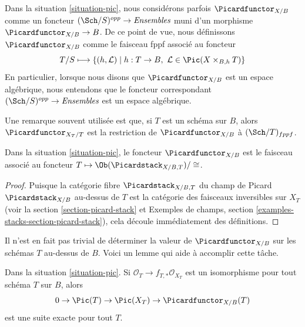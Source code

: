 \noindent
Dans la situation \ref{situation-pic}, nous considérons parfois
$\Picardfunctor_{X/B}$ comme un foncteur $(\Sch/S)^{opp} \to \textit{Ensembles}$
muni d'un morphisme $\Picardfunctor_{X/B} \to B$. De ce point de vue,
nous définissons $\Picardfunctor_{X/B}$ comme le faisceau fppf associé au
foncteur
$$
T/S \longmapsto \{(h, \mathcal{L}) \mid
h : T \to B,\ \mathcal{L} \in \Pic(X \times_{B, h} T)\}
$$
En particulier, lorsque nous disons que $\Picardfunctor_{X/B}$ est un espace
algébrique, nous entendons que le foncteur correspondant
$(\Sch/S)^{opp} \to \textit{Ensembles}$ est un espace algébrique.

\medskip\noindent
Une remarque souvent utilisée est que, si $T$ est un schéma sur $B$, alors
$\Picardfunctor_{X_T/T}$ est la restriction de $\Picardfunctor_{X/B}$ à
$(\Sch/T)_{fppf}$.

\begin{lemma}
\label{lemma-pic-over-pic}
Dans la situation \ref{situation-pic},
le foncteur $\Picardfunctor_{X/B}$ est le faisceau associé au
foncteur $T \mapsto \Ob(\Picardstack_{X/B, T})/\cong$.
\end{lemma}

\begin{proof}
Puisque la catégorie fibre $\Picardstack_{X/B, T}$ du champ de Picard
$\Picardstack_{X/B}$ au-dessus de $T$ est la catégorie des faisceaux inversibles
sur $X_T$ (voir la section \ref{section-picard-stack} et
Exemples de champs, section \ref{examples-stacks-section-picard-stack}),
cela découle immédiatement des définitions.
\end{proof}

\noindent
Il n'est en fait pas trivial de déterminer la valeur de $\Picardfunctor_{X/B}$
sur les schémas $T$ au-dessus de $B$. Voici un lemme qui aide à accomplir cette
tâche.

\begin{lemma}
\label{lemma-flat-geometrically-connected-fibres}
Dans la situation \ref{situation-pic}.
Si $\mathcal{O}_T \to f_{T, *}\mathcal{O}_{X_T}$ est un isomorphisme
pour tout schéma $T$ sur $B$, alors
$$
0 \to \Pic(T) \to \Pic(X_T) \to \Picardfunctor_{X/B}(T)
$$
est une suite exacte pour tout $T$.
\end{lemma}

